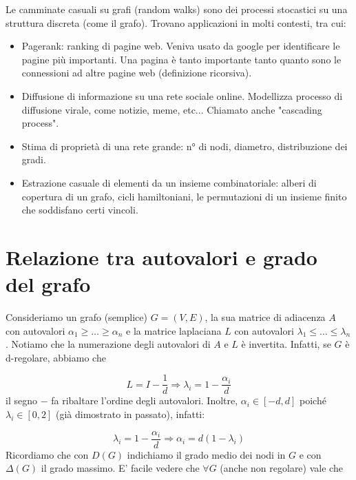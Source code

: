 \documentclass[12pt]{report}
\begin{document}
\noindent
Le camminate casuali su grafi (random walks) sono dei processi stocastici su una struttura discreta (come il grafo). Trovano applicazioni in molti contesti, tra cui:

\begin{itemize}
    \item Pagerank: ranking di pagine web. Veniva usato da google per identificare le pagine più importanti. Una pagina è tanto importante tanto quanto sono le connessioni ad altre pagine web (definizione ricorsiva).
    \item Diffusione di informazione su una rete sociale online. Modellizza processo di diffusione virale, come notizie, meme, etc... Chiamato anche "cascading process".
    \item Stima di proprietà di una rete grande: n° di nodi, diametro, distribuzione dei gradi.
    \item Estrazione casuale di elementi da un insieme combinatoriale: alberi di copertura di un grafo, cicli hamiltoniani, le permutazioni di un insieme finito che soddisfano certi vincoli. 
\end{itemize}

\section{Relazione tra autovalori e grado del grafo}
Consideriamo un grafo  (semplice) $G = (V,E)$, la sua matrice di adiacenza $A$ con autovalori $\alpha_1 \geq \dots \geq \alpha_n$ e la matrice laplaciana $L$ con autovalori $\lambda_1 \leq \dots \leq \lambda_n$. Notiamo che la numerazione degli autovalori di $A$ e $L$ è invertita. Infatti, se $G$ è d-regolare, abbiamo che

$$L = I - \frac{1}{d} \Rightarrow \lambda_i = 1 - \frac{\alpha_i}{d}$$
il segno $-$ fa ribaltare l'ordine degli autovalori. Inoltre, $\alpha_i \in [-d,d]$ poiché $\lambda_i \in [0,2]$ (già dimostrato in passato), infatti:

$$\lambda_i = 1 - \frac{\alpha_i}{d} \Rightarrow \alpha_i = d(1 - \lambda_i)$$
Ricordiamo che con $D(G)$ indichiamo il grado medio dei nodi in $G$ e con $\Delta(G)$ il grado massimo. E' facile vedere che $\forall G$ (anche non regolare) vale che 
\end{document}
